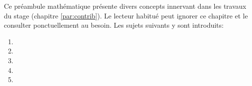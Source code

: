 Ce préambule mathématique présente divers concepts innervant dans les travaux du stage (chapitre \ref{par:contrib}). Le lecteur habitué peut ignorer ce chapitre et 
le consulter ponctuellement au besoin. Les sujets suivants y sont introduits:
\begin{enumerate}
    \item
    \item
    \item
    \item
    \item
\end{enumerate}